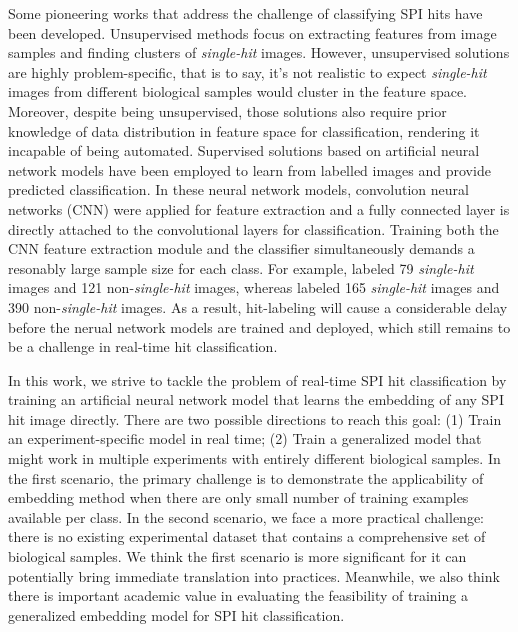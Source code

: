 Some pioneering works that address the challenge of classifying SPI hits have
been developed.  Unsupervised methods
\cite{yoonUnsupervisedClassificationSingleparticle2011,
giannakisSymmetriesImageFormation2012,schwanderSymmetriesImageFormation2012,
yoonNovelAlgorithmsCoherent2012,
andreassonAutomatedIdentificationClassification2014,
bobkovSortingAlgorithmsSingleparticle2015} focus on extracting features from
image samples and finding clusters of \textit{single-hit} images.  However,
unsupervised solutions are highly problem-specific, that is to say, it's not
realistic to expect \textit{single-hit} images from different biological samples
would cluster in the feature space.  Moreover, despite being unsupervised, those
solutions also require prior knowledge of data distribution in feature space for
classification, rendering it incapable of being automated. Supervised solutions
based on artificial neural network models
\cite{shiEvaluationPerformanceClassification2019,
ignatenkoClassificationDiffractionPatterns2021} have been employed to learn from
labelled images and provide predicted classification.  In these neural network
models, convolution neural networks (CNN) were applied for feature extraction
and a fully connected layer is directly attached to the convolutional layers for
classification.  Training both the CNN feature extraction module and the
classifier simultaneously demands a resonably large sample size for each class.
For example, \cite{shiEvaluationPerformanceClassification2019} labeled 79
\textit{single-hit} images and 121 non-\textit{single-hit} images, whereas
\cite{ignatenkoClassificationDiffractionPatterns2021} labeled 165
\textit{single-hit} images and 390 non-\textit{single-hit} images.  As a result,
hit-labeling will cause a considerable delay before the nerual network models
are trained and deployed, which still remains to be a challenge in real-time
hit classification.  



In this work, we strive to tackle the problem of real-time SPI hit
classification by training an artificial neural network model that learns the
embedding of any SPI hit image directly.  There are two possible directions to
reach this goal: (1) Train an experiment-specific model in real time; (2) Train
a generalized model that might work in multiple experiments with entirely
different biological samples.  In the first scenario, the primary challenge is
to demonstrate the applicability of embedding method when there are only small
number of training examples available per class.  In the second scenario, we
face a more practical challenge: there is no existing experimental dataset that
contains a comprehensive set of biological samples.  We think the first scenario
is more significant for it can potentially bring immediate translation into
practices. Meanwhile, we also think there is important academic value in
evaluating the feasibility of training a generalized embedding model for SPI hit
classification.  

